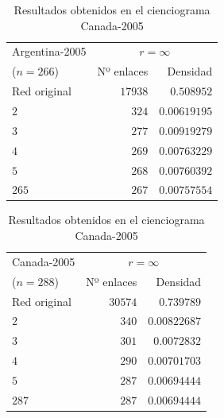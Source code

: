 \documentclass[10pt,a4paper,spanish]{article}
\numberwithin{equation}{section} %
\numberwithin{figure}{section} %
\numberwithin{table}{section} %
\begin{document}
\begin{table}[!h]
\begin{minipage}{0.5\textwidth}
\centering
\begin{tabular}{lrr}
\hline
 Argentina-2005 & \multicolumn{2}{c}{$r = \infty$} \\
($n=266$)   &   Nº  enlaces &    Densidad \\
\hline
 Red original                 &               $17938$ & $0.508952$ \\
 $2$                            &                 $324$ & $0.00619195$  \\
 $3$                            &                 $277$ & $0.00919279$  \\
 $4$                            &                 $269$ & $0.00763229$  \\
 $5$                            &                 $268$ & $0.00760392$  \\
 $265$                          &                 $267$ & $0.00757554$   \\
\hline
\end{tabular}
\caption{Resultados obtenidos en el cienciograma Argentina-2005}
\label{argentina2005}
\end{minipage}
\begin{minipage}{0.5\textwidth}
\centering
\begin{tabular}{lrr}
\hline
 Canada-2005 & \multicolumn{2}{c}{$r = \infty$} \\
($n=288$)   &   Nº  enlaces &    Densidad \\
\hline
 Red original              &               $30574$ & $0.739789$ \\
 $2$                         &                 $340$ & $0.00822687$  \\
 $3$                         &                 $301$ & $0.0072832$  \\
 $4$                         &                 $290$ & $0.00701703$  \\
 $5$                         &                 $287$ & $0.00694444$  \\
 $287$                       &                 $287$ & $0.00694444$  \\
\hline
\end{tabular}
\caption{Resultados obtenidos en el cienciograma Canada-2005}
\label{canada2005}
\end{minipage}
\end{table}
\end{document}
